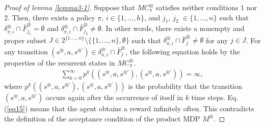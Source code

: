 \documentclass[a4j,12pt,oneside,openany,english,dvipdfmx]{jsbook}
\begin{document}
\begin{proof}[Proof of lemma \ref{lemma3-1}]
  Suppose that $MC^{\otimes}_{\pi}$ satisfies neither conditions 1 nor 2. Then, there exists a policy $\pi$, $i \in \{ 1, \ldots ,h \}$, and $j_1$, $j_2$ $\in \{ 1, \ldots ,n \}$ such that $\delta^{\otimes}_{\pi,i} \cap \bar{F}^{\otimes}_{j_1} = \emptyset$ and $\delta^{\otimes}_{\pi,i} \cap \bar{F}^{\otimes}_{j_2} \neq \emptyset$. In other words, there exists a nonempty and proper subset $J \in 2^{\{ 1, \ldots ,n \}} \setminus \{ \{ 1, \ldots ,n \}, \emptyset \}$ such that $ \delta^{\otimes}_{\pi,i} \cap \bar{F}^{\otimes}_j \neq \emptyset $ for any $j \in J$.
   For any transition $ (s^{\otimes},a,s^{\otimes \prime}) \in \delta^{\otimes}_{\pi,i} \cap \bar{F}^{\otimes}_j$, the following equation holds by the properties of the recurrent states in $MC^{\otimes}_{\pi}$\cite{ESS}.
  \begin{align}
    \sum_{k=0}^{\infty} p^k((s^{\otimes},a,s^{\otimes \prime}),(s^{\otimes},a,s^{\otimes \prime})) = \infty,
    \label{eq15}
  \end{align}
  where $p^k((s^{\otimes},a,s^{\otimes \prime}),(s^{\otimes},a,s^{\otimes \prime}))$ is the probability that the transition $(s^{\otimes},a,s^{\otimes \prime})$ occurs again after the occurrence of itself in $k$ time steps. Eq. (\ref{eq15}) means that the agent obtains a reward infinitely often. This contradicts the definition of the acceptance condition of the product MDP $M^{\otimes}$.
\end{proof}
\end{document}
